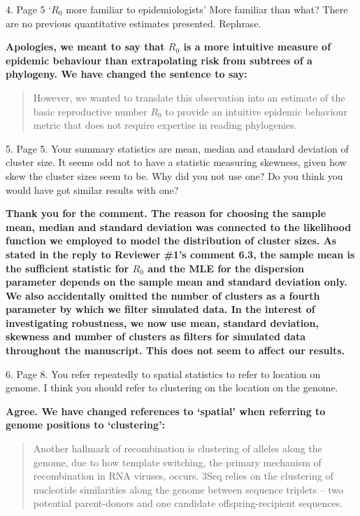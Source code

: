 \documentclass[11pt,oneside,letterpaper]{article}
\begin{document}
4. Page 5 `$R_0$ more familiar to epidemiologists' More familiar than what? There are no previous quantitative estimates presented. Rephrase.

\textbf{Apologies, we meant to say that $R_{0}$ is a more intuitive measure of epidemic behaviour than extrapolating risk from subtrees of a phylogeny. We have changed the sentence to say:}

\begin{quotation}
However, we wanted to translate this observation into an estimate of the basic reproductive number $R_{0}$ to provide an intuitive epidemic behaviour metric that does not require expertise in reading phylogenies.
\end{quotation}

5. Page 5. Your summary statistics are mean, median and standard deviation of cluster size. It seems odd not to have a statistic measuring skewness, given how skew the cluster sizes seem to be. Why did you not use one? Do you think you would have got similar results with one?

\textbf{Thank you for the comment.
The reason for choosing the sample mean, median and standard deviation was connected to the likelihood function we employed to model the distribution of cluster sizes.
As stated in the reply to Reviewer \#1's comment 6.3, the sample mean is the sufficient statistic for $R_0$ and the MLE for the dispersion parameter depends on the sample mean and standard deviation only.
We also accidentally omitted the number of clusters as a fourth parameter by which we filter simulated data.
In the interest of investigating robustness, we now use mean, standard deviation, skewness and number of clusters as filters for simulated data throughout the manuscript.
This does not seem to affect our results.}

6. Page 8. You refer repeatedly to spatial statistics to refer to location on genome. I think you should refer to clustering on the location on the genome.

\textbf{Agree. We have changed references to `spatial' when referring to genome positions to `clustering':}

\begin{quotation}
Another hallmark of recombination is clustering of alleles along the genome, due to how template switching, the primary mechanism of recombination in RNA viruses, occurs.
3Seq relies on the clustering of nucleotide similarities along the genome between sequence triplets -- two potential parent-donors and one candidate offspring-recipient sequences.
\end{quotation}
\end{document}
